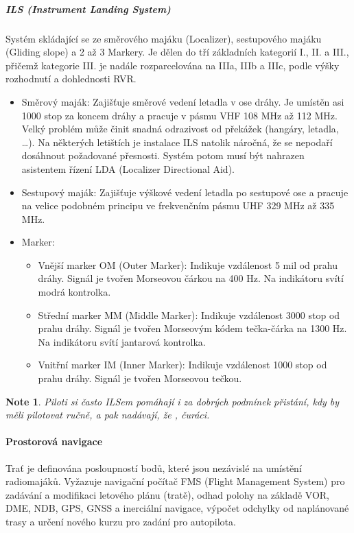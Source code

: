 \documentclass[11pt,a4paper]{article}
\theoremstyle{my-theorem}
\theoremstyle{non-theorem}
\newtheorem{note}[theorem]{Note}
\begin{document}
\subparagraph*{ILS (Instrument Landing System)} Systém skládající se ze směrového majáku (Localizer), sestupového majáku (Gliding slope) a 2 až 3 Markery. Je dělen do tří základních kategorií I., II. a III., přičemž kategorie III. je nadále rozparcelována na IIIa, IIIb a IIIc, podle výšky rozhodnutí a dohlednosti RVR.
\begin{itemize}
    \item Směrový maják: Zajišťuje směrové vedení letadla v ose dráhy. Je umístěn asi 1000 stop za koncem dráhy a pracuje v pásmu VHF 108 MHz až 112 MHz. Velký problém může činit snadná odrazivost od překážek (hangáry, letadla, \dots). Na některých letištích je instalace ILS natolik náročná, že se nepodaří dosáhnout požadované přesnosti. Systém potom musí být nahrazen  asistentem řízení LDA (Localizer Directional Aid).
    \item Sestupový maják: Zajišťuje výškové vedení letadla po sestupové ose a pracuje na velice podobném principu ve frekvenčním pásmu UHF 329 MHz až 335 MHz.
    \item Marker: \begin{itemize}
        \item Vnější marker OM (Outer Marker): Indikuje vzdálenost 5 mil od prahu dráhy. Signál je tvořen Morseovou čárkou na 400 Hz. Na indikátoru svítí modrá kontrolka.
        \item Střední marker MM (Middle Marker): Indikuje vzdálenost 3000 stop od prahu dráhy. Signál je tvořen Morseovým kódem tečka-čárka na 1300 Hz. Na indikátoru svítí jantarová kontrolka.
        \item Vnitřní marker IM (Inner Marker): Indikuje vzdálenost 1000 stop od prahu dráhy. Signál je tvořen Morseovou tečkou.
    \end{itemize}
\end{itemize}
\begin{note}
    Piloti si často ILSem pomáhají i za dobrých podmínek přistání, kdy by měli pilotovat ručně, a pak nadávají, že , čuráci.
\end{note}

\paragraph*{Prostorová navigace} Trať je definována posloupností bodů, které jsou nezávislé na umístění radiomajáků. Vyžazuje navigační počítač FMS (Flight Management System) pro zadávání a modifikaci letového plánu (tratě), odhad polohy na základě VOR, DME, NDB, GPS, GNSS a inerciální navigace, výpočet odchylky od naplánované trasy a určení nového kurzu pro zadání pro autopilota.
\end{document}
